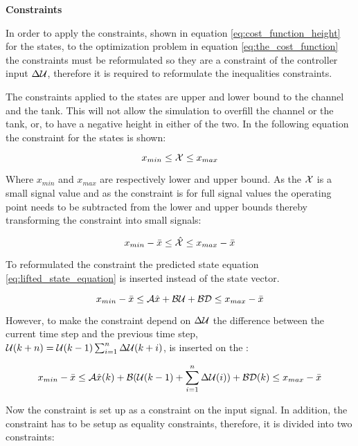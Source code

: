 \textbf{Constraints}

In order to apply the constraints, shown in equation \ref{eq:cost_function_height} for the states, to the optimization problem in equation \ref{eq:the_cost_function} the constraints must be reformulated so they are a constraint of the controller input $\Delta\CMcal{U}$, therefore it is required to reformulate the inequalities constraints. 

The constraints applied to the states are upper and lower bound to the channel and the tank. This will not allow the simulation to overfill the channel or the tank, or, to have a negative height in either of the two. In the following equation the constraint for the states is shown:  


\begin{equation}
    x_{min} \leq \CMcal{X} \leq x_{max}
\end{equation}

Where $x_{min}$ and $x_{max}$ are respectively lower and upper bound. As the $\CMcal{X}$ is a small signal value and as the constraint is for full signal values the operating point needs to be subtracted from the lower and upper bounds thereby transforming the constraint into small signals:

\begin{equation}
    x_{min}- \bar{x} \leq \hat{\CMcal{X}} \leq x_{max}-\bar{x}
\end{equation}

To reformulated the constraint the predicted state equation \ref{eq:lifted_state_equation} is inserted instead of the state vector.

\begin{equation}
     x_{min}- \bar{x} \leq \CMcal{A}\hat{x}+\CMcal{B}\CMcal{U}+\CMcal{BD} \leq x_{max}-\bar{x}
 \end{equation} 

However, to make the constraint depend on $\Delta \CMcal{U}$ the difference between the current time step and the previous time step, $\CMcal{U}(k+n) = \CMcal{U}(k-1) \sum_{i=1}^n\Delta \CMcal{U}(k+i) $, is inserted on the : 

\begin{equation}
     x_{min}- \bar{x} \leq \CMcal{A}\hat{x}(k)+\CMcal{B}(\CMcal{U}(k-1)+\sum_{i=1}^n \Delta\CMcal{U}(i))+\CMcal{B}\CMcal{D}(k) \leq x_{max}-\bar{x}
 \end{equation} 


 Now the constraint is set up as a constraint on the input signal. In addition, the constraint has to be setup as equality constraints, therefore, it is divided into two constraints: 

